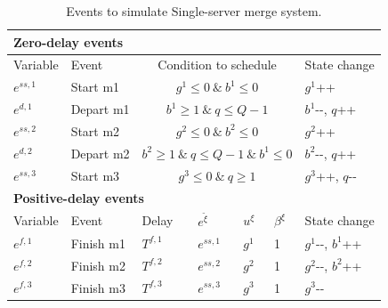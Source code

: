 \documentclass[]{interact}
\theoremstyle{plain}%
\theoremstyle{definition}
\theoremstyle{remark}
\begin{document}
\begin{table}[h]
	\begin{tabular}{lllllll} 
		\multicolumn{7}{l}{\textbf{Zero-delay events}}\\ \hline
		Variable&Event &  \multicolumn{4}{c}{Condition to schedule} & State change\\\hline
		$e^{ss,1}$ & Start m1 &  \multicolumn{4}{c}{$g^1\le 0\ \&\ b^1\le0 $} & $g^1${\footnotesize++} \\
		$e^{d,1}$&Depart m1&  \multicolumn{4}{c}{$b^1\ge1\ \&\  q\le Q-1$} &$b^1${\small-}{\small-}, $q${\footnotesize++} \\
		$e^{ss,2}$& Start m2 &  \multicolumn{4}{c}{$g^2\le 0\ \&\ b^2\le0 $} & $g^2${\footnotesize++} \\
		$e^{d,2}$&Depart m2&\multicolumn{4}{c}{$b^2\ge1\ \&\ q\le Q-1\ \&\ b^1\le 0$}&  $b^2${\small-}{\small-}, $q${\footnotesize++} \\
		$e^{ss,3}$ & Start m3 & \multicolumn{4}{c}{$g^3 \le 0\ \&\ q\ge 1$}&$g^3${\footnotesize++}, $q${\small-}{\small-} \\
		\multicolumn{7}{l}{\textbf{Positive-delay events}}\\ \hline
		Variable&Event 		   & Delay& $e^{\tilde{\xi}}$& $u^{\xi}$ &$\beta^{\xi}$& State change\\\hline
		$e^{f,1}$&Finish m1 & $T^{f,1}$& $e^{ss,1}$&  $g^1$&1&  $g^1${\small-}{\small-}, $b^1${\footnotesize++}\\	
		$e^{f,2}$&Finish m2 & $T^{f,2}$& $e^{ss,2}$&  $g^2$&1&  $g^2${\small-}{\small-}, $b^2${\footnotesize++}\\	
		$e^{f,3}$&Finish m3 & $T^{f,3}$& $e^{ss,3}$&  $g^3$&1&  $g^3${\small-}{\small-}\\	\hline
	\end{tabular}
	\caption{Events to simulate Single-server merge system.}
	\label{tab:merge}
\end{table}
\end{document}
